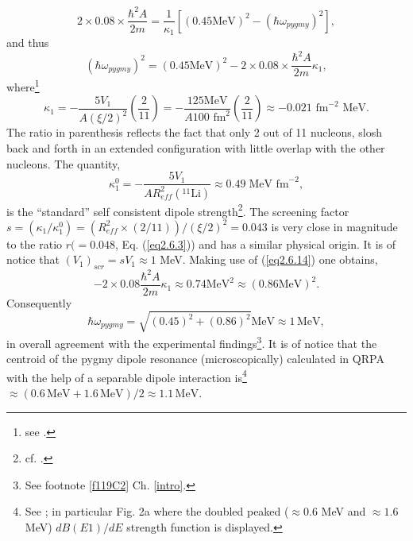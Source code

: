 \begin{equation}
2\times 0.08\times \frac{\hbar^2A}{2m}=\frac{1}{\kappa_1}[(0.45\text{MeV})^2-(\hbar \omega_{pygmy})^2],
\end{equation}
 and thus
\begin{equation}
 (\hbar\omega_{pygmy})^2=(0.45 \text{MeV})^2-2\times 0.08\times\frac{\hbar^2A}{2m}\kappa_1,
\end{equation}
 where\footnote{see \cite{Bortignon:98}.}
\begin{equation}\label{eq2.6.14}
\kappa_1=-\frac{5V_1}{A(\xi/2)^2}\left(\frac{2}{11}\right)=-\frac{125\text{MeV}}{A 100 \text{ fm}^2}\left(\frac{2}{11}\right)\approx -0.021\text{ fm}^{-2}\text{ MeV}.
\end{equation}
The ratio in parenthesis reflects the fact that only 2 out of 11 nucleons, slosh back and forth in an extended configuration with little overlap with the other nucleons. The quantity,
\begin{equation}\label{eq2.6.21}
\kappa_1^0=-\frac{5V_1}{AR^2_{eff}(^{11}\text{Li})}\approx 0.49\; \text{MeV fm}^{-2},
\end{equation}
is the ``standard'' self consistent dipole strength\footnote{cf. \cite{Bohr:75}.}. The screening factor $s=(\kappa_1/\kappa_1^0)=(R^2_{eff}\times(2/11))/(\xi/2)^2=0.043$ is very close in magnitude to the ratio $r(=0.048$, Eq. (\ref{eq2.6.3})) and has a similar physical origin. It is of notice that $(V_1)_{scr}=sV_1\approx 1$ MeV. Making use of (\ref{eq2.6.14})  one obtains,
\begin{equation}
-2\times 0.08\frac{\hbar^2A}{2m}\kappa_1\approx 0.74 \text{MeV}^2\approx (0.86\text{MeV})^2.
\end{equation} 
 Consequently
\begin{equation}\label{eq3.6.23}
\hbar \omega_{pygmy}=\sqrt{(0.45)^2+(0.86)^2}\text{MeV}\approx 1\, \text{MeV},
\end{equation}  
 in overall agreement with the experimental findings\footnote{See footnote \ref{f119C2} Ch. \ref{intro}.}. It is of notice that the centroid of the pygmy dipole resonance 
  (microscopically) calculated in  QRPA with the help of a separable dipole interaction is\footnote{See \cite{Barranco:01}; in particular  Fig. 2a where the doubled peaked ($\approx0.6$ MeV and $\approx1.6$ MeV) $dB(E1)/dE$ strength function is displayed.} $\approx (0.6\,\text{MeV}+ 1.6\, \text{MeV})/2\approx 1.1\, \text{MeV}$.

